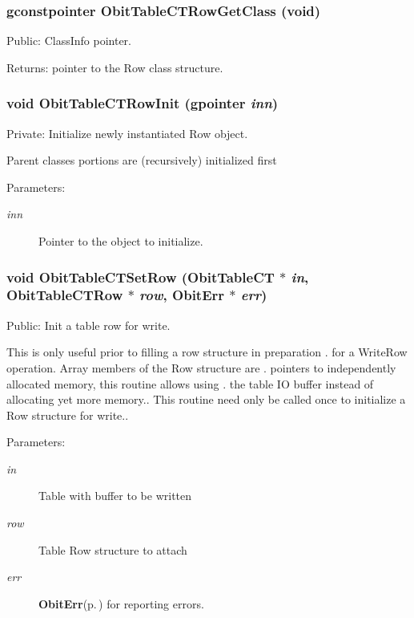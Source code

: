 \subsubsection{\setlength{\rightskip}{0pt plus 5cm}gconstpointer Obit\-Table\-CTRow\-Get\-Class (void)}\label{ObitTableCT_8c_a15}


Public: Class\-Info pointer. 

\begin{Desc}
\item[Returns:]pointer to the Row class structure. \end{Desc}
\subsubsection{\setlength{\rightskip}{0pt plus 5cm}void Obit\-Table\-CTRow\-Init (gpointer {\em inn})}\label{ObitTableCT_8c_a6}


Private: Initialize newly instantiated Row object. 

Parent classes portions are (recursively) initialized first \begin{Desc}
\item[Parameters:]
\begin{description}
\item[{\em inn}]Pointer to the object to initialize. \end{description}
\end{Desc}
\subsubsection{\setlength{\rightskip}{0pt plus 5cm}void Obit\-Table\-CTSet\-Row ({\bf Obit\-Table\-CT} $\ast$ {\em in}, {\bf Obit\-Table\-CTRow} $\ast$ {\em row}, {\bf Obit\-Err} $\ast$ {\em err})}\label{ObitTableCT_8c_a23}


Public: Init a table row for write. 

This is only useful prior to filling a row structure in preparation . for a Write\-Row operation. Array members of the Row structure are . pointers to independently allocated memory, this routine allows using . the table IO buffer instead of allocating yet more memory.. This routine need only be called once to initialize a Row structure for write.. \begin{Desc}
\item[Parameters:]
\begin{description}
\item[{\em in}]Table with buffer to be written \item[{\em row}]Table Row structure to attach \item[{\em err}]{\bf Obit\-Err}{\rm (p.\,\pageref{structObitErr})} for reporting errors. \end{description}
\end{Desc}
